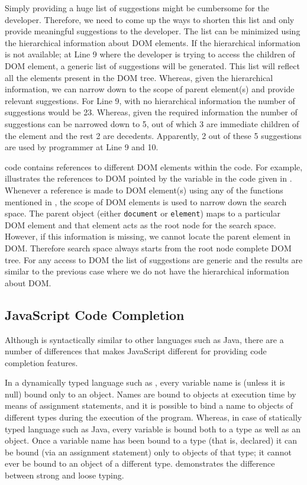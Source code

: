 	Simply providing a huge list of suggestions might be cumbersome for the developer. Therefore, we need to come up the ways to shorten this list and only provide meaningful suggestions to the developer. The list can be minimized using the hierarchical information about DOM elements. If the hierarchical information is not available; at Line 9 where the developer is trying to access the children of DOM element, a generic list of suggestions will be generated. This list will reflect all the elements present in the DOM tree. Whereas, given the hierarchical information, we can narrow down to the scope of parent element(s) and provide relevant suggestions. For Line 9, with no hierarchical information the number of suggestions would be 23. Whereas, given the required information the number of suggestions can be narrowed down to 5, out of which 3 are immediate children of the element and the rest 2 are decedents. Apparently, 2 out of these 5 suggestions are used by programmer at Line 9 and 10. 
			

	
	
	\javascript code contains references to different DOM elements within the code. For example,  illustrates the references to DOM pointed by the \javascript variable in the code given in . Whenever a reference is made to DOM element(s) using any of the functions mentioned in , the scope of DOM elements is used to narrow down the search space. The parent object (either \texttt{document} or \texttt{element}) maps to a particular DOM element and that element acts as the root node for the search space. However, if this information is missing, we cannot locate the parent element in DOM. Therefore search space always starts from the root node \ie complete DOM tree. For any access to DOM the list of suggestions are generic and the results are similar to the previous case where we do not have the hierarchical information about DOM.
	
	\subsection{JavaScript Code Completion}
	\label{Sec:Code-completion}
	
	Although \javascript is syntactically similar to other languages such as Java, there are a number of differences that makes JavaScript different for providing code completion features.
	
	
		In a dynamically typed language such as \javascript, every variable name is (unless it is null) bound only to an object. Names are bound to objects at execution time by means of assignment statements, and it is possible to bind a name to objects of different types during the execution of the program. Whereas, in case of statically typed language such as Java, every variable is bound both to a type as well as an object. Once a variable name has been bound to a type (that is, declared) it can be bound (via an assignment statement) only to objects of that type; it cannot ever be bound to an object of a different type.  demonstrates the difference between strong and loose typing.

